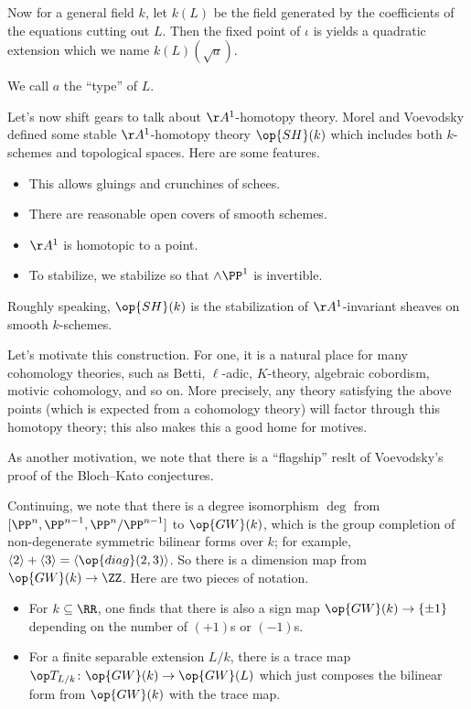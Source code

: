 \documentclass{article}
\begin{document}
Now for a general field $k$, let $k(L)$ be the field generated by the coefficients of the equations cutting out $L$. Then the fixed point of $\iota$ is yields a quadratic extension which we name $k(L)(\sqrt a)$.
\begin{definition}
	We call $a$ the ``type'' of $L$.
\end{definition}
Let's now shift gears to talk about $\AA^1$-homotopy theory. Morel and Voevodsky defined some stable $\AA^1$-homotopy theory $\op{SH}(k)$ which includes both $k$-schemes and topological spaces. Here are some features.
\begin{itemize}
	\item This allows gluings and crunchines of schees.
	\item There are reasonable open covers of smooth schemes.
	\item $\AA^1$ is homotopic to a point.
	\item To stabilize, we stabilize so that $\land\PP^1$ is invertible.
\end{itemize}
Roughly speaking, $\op{SH}(k)$ is the stabilization of $\AA^1$-invariant sheaves on smooth $k$-schemes.
\begin{remark}
	Let's motivate this construction. For one, it is a natural place for many cohomology theories, such as Betti, $\ell$-adic, $K$-theory, algebraic cobordism, motivic cohomology, and so on. More precisely, any theory satisfying the above points (which is expected from a cohomology theory) will factor through this homotopy theory; this also makes this a good home for motives.
\end{remark}
\begin{remark}
	As another motivation, we note that there is a ``flagship'' reslt of Voevodsky's proof of the Bloch--Kato conjectures.
\end{remark}
Continuing, we note that there is a degree isomorphism $\deg$ from $[\PP^n,\PP^{n-1},\PP^n/\PP^{n-1}]$ to $\op{GW}(k)$, which is the group completion of non-degenerate symmetric bilinear forms over $k$; for example, $\langle2\rangle+\langle3\rangle=\langle\op{diag}(2,3)\rangle$. So there is a dimension map from $\op{GW}(k)\to\ZZ$. Here are two pieces of notation.
\begin{itemize}
	\item For $k\subseteq\RR$, one finds that there is also a sign map $\op{GW}(k)\to\{\pm1\}$ depending on the number of $(+1)$s or $(-1)$s.
	\item For a finite separable extension $L/k$, there is a trace map $\op T_{L/k}\colon\op{GW}(k)\to\op{GW}(L)$ which just composes the bilinear form from $\op{GW}(k)$ with the trace map.
\end{itemize}
\end{document}
